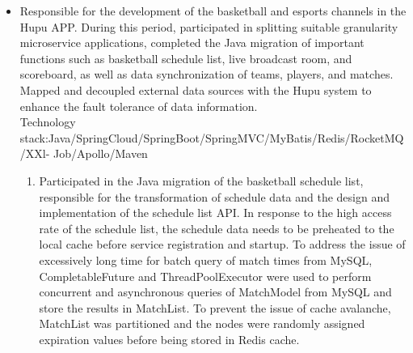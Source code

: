 \documentclass{resume}
\newcommand{\en}[1]{#1}
\newcommand{\zh}[1]{}
\begin{document}
\begin{itemize}
            \item \en{Responsible for the development of the basketball and esports channels in the Hupu APP. During this period, participated in splitting suitable granularity microservice applications, completed the Java migration of important functions such as basketball schedule list, live broadcast room, and scoreboard, as well as data synchronization of teams, players, and matches. Mapped and decoupled external data sources with the Hupu system to enhance the fault tolerance of data information.
            \\Technology stack:Java/SpringCloud/SpringBoot/SpringMVC/MyBatis/Redis/RocketMQ/XXl- Job/Apollo/Maven}
            \zh{负责虎扑APP中篮球、电竞频道的研发。期间参与拆分颗粒度合适的微服务应用，完成篮球赛程列
表、赛事直播间、比分牌等重要功能的Java化迁移，以及球队球员、比赛等数据同步，将外部数据源
与虎扑系统进行映射和解耦，增强数据信息的容错性。
	   \\使用的技术栈:Java/SpringCloud/SpringBoot/SpringMVC/MyBatis/Redis/RocketMQ/XXl- Job/Apollo/Maven}\\
	   \begin{enumerate}
		 \item \en{Participated in the Java migration of the basketball schedule list, responsible for the transformation of schedule data and the design and implementation of the schedule list API. In response to the high access rate of the schedule list, the schedule data needs to be preheated to the local cache before service registration and startup. To address the issue of excessively long time for batch query of match times from MySQL, CompletableFuture and ThreadPoolExecutor were used to perform concurrent and asynchronous queries of MatchModel from MySQL and store the results in MatchList. To prevent the issue of cache avalanche, MatchList was partitioned and the nodes were randomly assigned expiration values before being stored in Redis cache.}
           	\zh{参与篮球赛程列表Java化，负责赛程数据的转化，以及赛程列表API接又设计与实现。针对赛程 列表高访问接又，服务注册启动前，需要对赛程数据预热到本地缓存。遇到从MySQL批量查询 比赛时间过长问题，于是采用CompletableFuture和ThreadPoolExecutor结合并发异步查询MySQL 获取MatchModel，存储在MatchList中。为了防止缓存雪崩问题，将MatchList分批次节点打散设 置随机过期值，存储到Redis缓存。 }\\


\end{enumerate}
\end{itemize}
\end{document}
